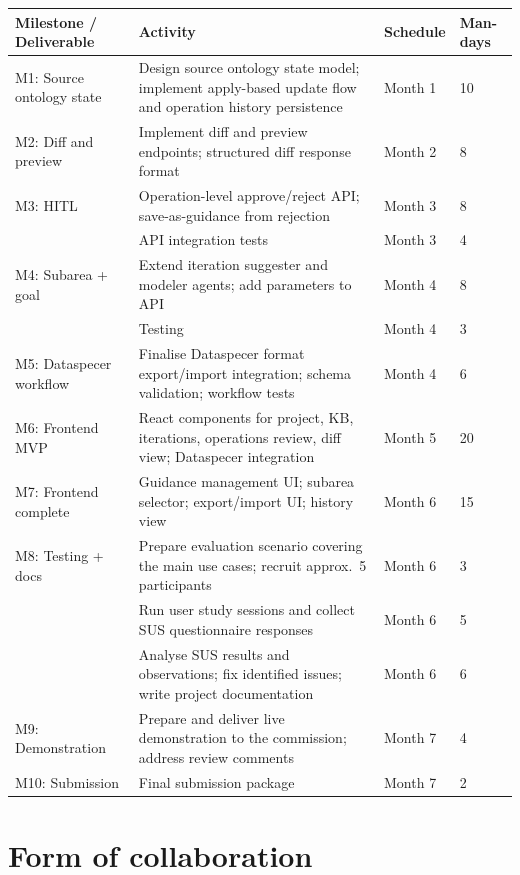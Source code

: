 \documentclass{article}
\begin{document}
\hskip-0.5cm
\begin{longtable}{ | m{13em} | m{18em} | m{2.5cm} | m{1.3cm} | }
   \hline
 Milestone / Deliverable & Activity & Schedule & Man-days \\
 \hline
 M1: Source ontology state & Design source ontology state model; implement apply-based update flow and operation history persistence & Month 1 & 10 \\
 \hline
 M2: Diff and preview & Implement diff and preview endpoints; structured diff response format & Month 2 & 8 \\
 \hline
 M3: HITL & Operation-level approve/reject API; save-as-guidance from rejection & Month 3 & 8 \\
                 & API integration tests & Month 3 & 4 \\
 \hline
 M4: Subarea + goal & Extend iteration suggester and modeler agents; add parameters to API & Month 4 & 8 \\
                    & Testing & Month 4 & 3 \\
 \hline
 M5: Dataspecer workflow & Finalise Dataspecer format export/import integration; schema validation; workflow tests & Month 4 & 6 \\
 \hline
 M6: Frontend MVP & React components for project, KB, iterations, operations review, diff view; Dataspecer integration & Month 5 & 20 \\
 \hline
 M7: Frontend complete & Guidance management UI; subarea selector; export/import UI; history view & Month 6 & 15 \\
 \hline
 M8: Testing + docs & Prepare evaluation scenario covering the main use cases; recruit approx.\ 5 participants & Month 6 & 3 \\
                    & Run user study sessions and collect SUS questionnaire responses & Month 6 & 5 \\
                    & Analyse SUS results and observations; fix identified issues; write project documentation & Month 6 & 6 \\
 \hline
 M9: Demonstration & Prepare and deliver live demonstration to the commission; address review comments & Month 7 & 4 \\
 \hline
 M10: Submission & Final submission package & Month 7 & 2 \\
 \hline
\end{longtable}

\section{Form of collaboration}
\end{document}
